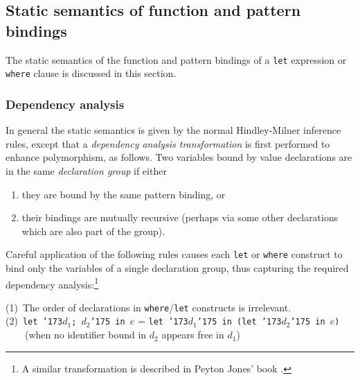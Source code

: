 \subsection{Static semantics of function and pattern bindings}

The static semantics of the function and pattern bindings of
a \mbox{\tt let} expression or \mbox{\tt where} clause
is discussed in this section.

\subsubsection{Dependency analysis}

In general the static semantics is given by the
normal Hindley-Milner inference rules,
except that a {\em dependency
analysis transformation} is first performed
to enhance polymorphism, as follows.
Two variables bound by value declarations are in the
same {\em declaration group} if either
\begin{enumerate}
\item
they are bound by the same pattern binding, or
\item
their bindings are mutually recursive (perhaps via some
other declarations which are also part of the group).
\end{enumerate}
Careful application of the following 
rules causes each \mbox{\tt let} or \mbox{\tt where} construct to bind only the
variables of a single declaration group, thus capturing the required
dependency analysis:\footnote{%
A similar transformation is described in 
Peyton Jones' book \cite{peyton-jones:book}.}
\begin{center}
(1)~The order of declarations in \mbox{\tt where}/\mbox{\tt let} constructs is irrelevant. \\
(2)~\mbox{\tt let\ {\char'173}}$d_1$\mbox{\tt ;\ }$d_2$\mbox{\tt {\char'175}\ in\ }$e$ = \mbox{\tt let\ {\char'173}}$d_1$\mbox{\tt {\char'175}\ in\ (let\ {\char'173}}$d_2$\mbox{\tt {\char'175}\ in\ }$e$\mbox{\tt )} \\
\ \ \ \ (when no identifier bound in $d_2$ appears free in $d_1$)
\et
\end{center}


